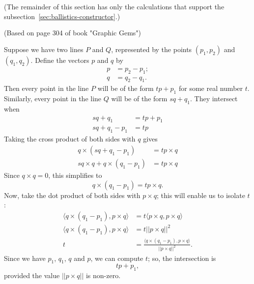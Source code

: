 \documentclass{article}
\begin{document}
(The remainder of this section has only the calculations
that support the subsection~\ref{sec:ballistics-constructor}.)

(Based on page 304 of book "Graphic Gems")

Suppose we have two lines $P$ and $Q$,
represented by the points $(p_1, p_2)$ and $(q_1, q_2)$.
Define the vectors $p$ and $q$ by
\begin{align*}
    p &= p_2 - p_1; \\
    q &= q_2 - q_1.
\end{align*}
Then every point in the line $P$ will be of the form $tp + p_1$
for some real number $t$.
Similarly, every point in the line $Q$ will be of the form $sq + q_1$.
They intersect when
\begin{align*}
    sq + q_1 &= tp + p_1 \\
    sq + q_1 - p_1 &= tp
\end{align*}
Taking the cross product of both sides with $q$ gives
\begin{align*}
    q \times (sq + q_1 - p_1) &= t p \times q \\
    s q \times q + q \times (q_1 - p_1) &= t p \times q
\end{align*}
Since $q \times q = 0$, this simplifies to
\begin{equation*}
    q \times (q_1 - p_1) = t p \times q.
\end{equation*}
Now, take the dot product of both sides with $p \times q$;
this will enable us to isolate $t$:
\begin{align*}
    \langle q \times (q_1 - p_1), p \times q \rangle
        &= t \langle p \times q, p \times q \rangle \\
    \langle q \times (q_1 - p_1), p \times q \rangle &= t ||p \times q||^2 \\
    t &= \frac{\langle q \times(q_1 - p_1), p \times q \rangle}{||p \times q||^2}.
\end{align*}
Since we have $p_1$, $q_1$, $q$ and $p$, we can compute $t$;
so, the intersection is
\begin{equation*}
    tp + p_1,
\end{equation*}
provided the value $|| p \times q ||$ is non-zero.
\end{document}
